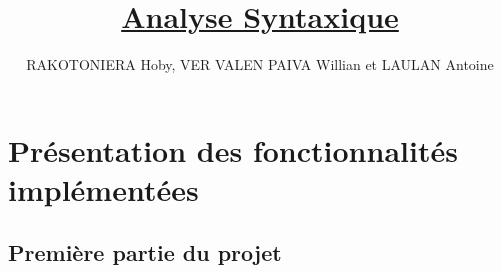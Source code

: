 \documentclass{article}
\begin{document}
\title{ \href{https://github.com/WillianPaiva/project_AS}{\textbf{Analyse Syntaxique}}}
\author{RAKOTONIERA Hoby, VER VALEN PAIVA Willian et LAULAN Antoine}

 
\maketitle
\newpage
\tableofcontents
\newpage

\section{Présentation des fonctionnalités implémentées}

\subsection{Première partie du projet}
\end{document}
